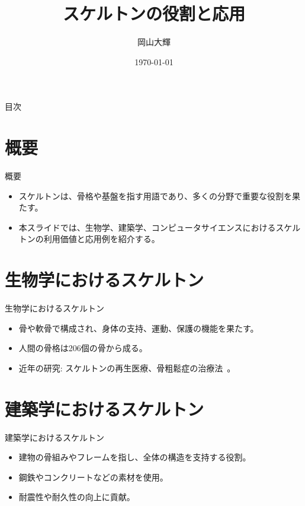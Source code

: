 \documentclass[aspectratio=169]{beamer}
\title{スケルトンの役割と応用}
\author{岡山大輝}
\institute{兵庫県立大学}
\date{\today}
\begin{document}
\begin{frame}
  \titlepage{}
\end{frame}

\begin{frame}{目次}
  \tableofcontents
\end{frame}

\section{概要}

\begin{frame}{概要}
  \begin{itemize}
    \item スケルトンは、骨格や基盤を指す用語であり、多くの分野で重要な役割を果たす。
    \item 本スライドでは、生物学、建築学、コンピュータサイエンスにおけるスケルトンの利用価値と応用例を紹介する。
  \end{itemize}
\end{frame}

\section{生物学におけるスケルトン}

\begin{frame}{生物学におけるスケルトン}
  \begin{itemize}
    \item 骨や軟骨で構成され、身体の支持、運動、保護の機能を果たす。
    \item 人間の骨格は206個の骨から成る。
    \item 近年の研究: スケルトンの再生医療、骨粗鬆症の治療法~\cite{okayama2024how}。
  \end{itemize}
\end{frame}

\section{建築学におけるスケルトン}

\begin{frame}{建築学におけるスケルトン}
  \begin{itemize}
    \item 建物の骨組みやフレームを指し、全体の構造を支持する役割。
    \item 鋼鉄やコンクリートなどの素材を使用。
    \item 耐震性や耐久性の向上に貢献。
  \end{itemize}
\end{frame}
\end{document}
